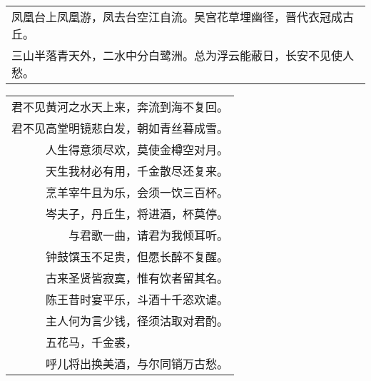 \nopagebreak%
\nopagebreak%
\noindent\begin{minipage}{\linewidth}
  \vskip-3pt\begin{table}[H]
    \centering
    \begin{tabular}{@{}l@{}}
凤凰台上凤凰游，凤去台空江自流。吴宫花草埋幽径，晋代衣冠成古丘。\\
三山半落青天外，二水中分白鹭洲。总为浮云能蔽日，长安不见使人愁。
    \end{tabular}
  \end{table}
\end{minipage}
\vspace{1cm}


\nopagebreak%
\nopagebreak%
\noindent\begin{minipage}{\linewidth}
  \vskip-3pt\begin{table}[H]
    \centering
    \begin{tabular}{@{}l@{}}
君不见黄河之水天上来，奔流到海不复回。\\
君不见高堂明镜悲白发，朝如青丝暮成雪。\\
　　　人生得意须尽欢，莫使金樽空对月。\\
　　　天生我材必有用，千金散尽还复来。\\
　　　烹羊宰牛且为乐，会须一饮三百杯。\\
　　　岑夫子，丹丘生，将进酒，杯莫停。\\
　　　　　与君歌一曲，请君为我倾耳听。\\
　　　钟鼓馔玉不足贵，但愿长醉不复醒。\\
　　　古来圣贤皆寂寞，惟有饮者留其名。\\
　　　陈王昔时宴平乐，斗酒十千恣欢谑。\\
　　　主人何为言少钱，径须沽取对君酌。\\
　　　五花马，千金裘，\\
　　　呼儿将出换美酒，与尔同销万古愁。
    \end{tabular}
  \end{table}
\end{minipage}
\vspace{1cm}


